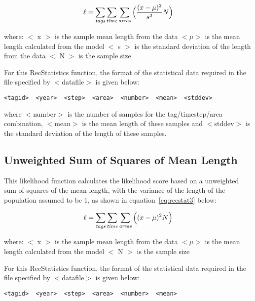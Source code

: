 \documentclass [a4paper, 10pt]{book}
\begin{document}
\begin{equation}\label{eq:recstat2}
\ell = \sum_{\it tags}\sum_{\it time}\sum_{\it areas} \Big(\frac{(x-\mu)^2} {s^2} N\Big)
\end{equation}

where:\newline
$<$ x $>$ is the sample mean length from the data\newline
$<\mu>$ is the mean length calculated from the model\newline
$<$ s $>$ is the standard deviation of the length from the data\newline
$<$ N $>$ is the sample size

\bigskip
For this RecStatistics function, the format of the statistical data required in the file specified by $<$datafile$>$ is given below:

{\small\begin{verbatim}
<tagid>  <year>  <step>  <area>  <number>  <mean>  <stddev>
\end{verbatim}}

where $<$number$>$ is the number of samples for the tag/timestep/area combination, $<$mean$>$ is the mean length of these samples and $<$stddev$>$ is the standard deviation of the length of these samples.

\subsection{Unweighted Sum of Squares of Mean Length}
This likelihood function calculates the likelihood score based on a unweighted sum of squares of the mean length, with the variance of the length of the population assumed to be 1, as shown in equation~\ref{eq:recstat3} below:

\begin{equation}\label{eq:recstat3}
\ell = \sum_{\it tags}\sum_{\it time}\sum_{\it areas} \Big((x-\mu)^2 N\Big)
\end{equation}

where:\newline
$<$ x $>$ is the sample mean length from the data\newline
$<\mu>$ is the mean length calculated from the model\newline
$<$ N $>$ is the sample size

\bigskip
For this RecStatistics function, the format of the statistical data required in the file specified by $<$datafile$>$ is given below:

{\small\begin{verbatim}
<tagid>  <year>  <step>  <area>  <number>  <mean>
\end{verbatim}}
\end{document}
